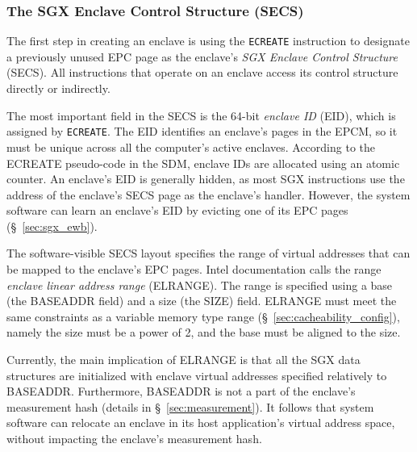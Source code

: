 \subsubsection{The SGX Enclave Control Structure (SECS)}
\label{sec:secs}


The first step in creating an enclave is using the \texttt{ECREATE} instruction
to designate a previously unused EPC page as the enclave's \textit{SGX Enclave
Control Structure} (SECS). All instructions that operate on an enclave access
its control structure directly or indirectly.


The most important field in the SECS is the 64-bit \textit{enclave ID} (EID),
which is assigned by \texttt{ECREATE}. The EID identifies an enclave's pages in
the EPCM, so it must be unique across all the computer's active enclaves.
According to the ECREATE pseudo-code in the SDM, enclave IDs are allocated
using an atomic counter. An enclave's EID is generally hidden, as most SGX
instructions use the address of the enclave's SECS page as the enclave's
handler. However, the system software can learn an enclave's EID by evicting
one of its EPC pages (\S~\ref{sec:sgx_ewb}).

The software-visible SECS layout specifies the range of virtual addresses that
can be mapped to the enclave's EPC pages. Intel documentation calls the range
\textit{enclave linear address range} (ELRANGE). The range is specified using a
base (the BASEADDR field) and a size (the SIZE) field. ELRANGE must meet the
same constraints as a variable memory type range
(\S~\ref{sec:cacheability_config}), namely the size must be a power of 2, and
the base must be aligned to the size.

Currently, the main implication of ELRANGE is that all the SGX data structures
are initialized with enclave virtual addresses specified relatively to
BASEADDR. Furthermore, BASEADDR is not a part of the enclave's measurement
hash (details in \S~\ref{sec:measurement}). It follows that system software can
relocate an enclave in its host application's virtual address space, without
impacting the enclave's measurement hash.

